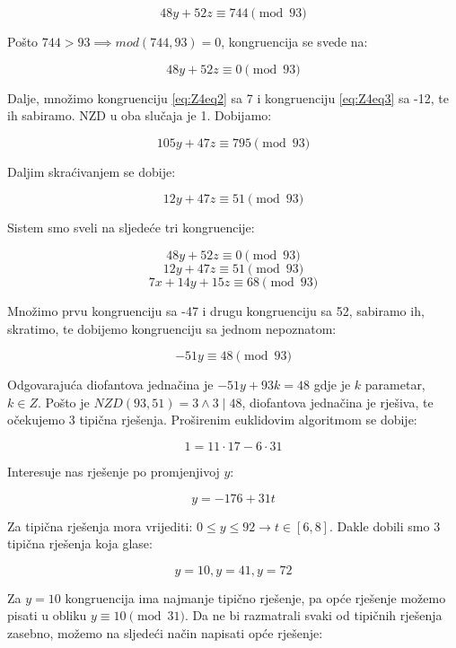 \documentclass[12pt]{article}
\begin{document}
$$48y + 52z \equiv 744 \pmod{93}$$\vspace{1mm}

Pošto $744 > 93 \implies mod(744, 93) = 0$, kongruencija se svede na:

$$48y + 52z \equiv 0 \pmod{93}$$ \vspace{1mm}

Dalje, množimo kongruenciju \ref{eq:Z4eq2} sa 7 i kongruenciju \ref{eq:Z4eq3} sa -12, te ih sabiramo. NZD u oba slučaja je 1. Dobijamo:

$$105y + 47z \equiv 795 \pmod{93}$$\vspace{1mm}

Daljim skraćivanjem se dobije:

$$12y + 47z \equiv 51 \pmod{93}$$\vspace{1mm}

Sistem smo sveli na sljedeće tri kongruencije:

$$48y + 52z \equiv 0 \pmod{93}$$
$$12y + 47z \equiv 51 \pmod{93}$$
$$7x + 14y + 15z \equiv 68 \pmod{93}$$\vspace{1mm}

Množimo prvu kongruenciju sa -47 i drugu kongruenciju sa 52, sabiramo ih, skratimo, te dobijemo kongruenciju sa jednom nepoznatom:

$$-51y \equiv 48 \pmod{93}$$\vspace{1mm}

Odgovarajuća diofantova jednačina je $-51y + 93k = 48$ gdje je $k$ parametar, $k \in Z$. Pošto je $NZD(93, 51) = 3 \land 3 \mid 48$, diofantova jednačina je rješiva, te očekujemo 3 tipična rješenja. Proširenim euklidovim algoritmom se dobije:

$$1 = 11 \cdot 17 - 6 \cdot 31$$\vspace{1mm}

Interesuje nas rješenje po promjenjivoj $y$:

$$y = -176 + 31t$$\vspace{1mm}

Za tipična rješenja mora vrijediti: $0 \leq y \leq 92 \to t \in [6, 8]$. Dakle dobili smo 3 tipična rješenja koja glase:

$$y = 10, y = 41, y = 72$$\vspace{1mm}

Za $y = 10$ kongruencija ima najmanje tipično rješenje, pa opće rješenje možemo pisati u obliku $y \equiv 10 \pmod{31}$. Da ne bi razmatrali svaki od tipičnih rješenja zasebno, možemo na sljedeći način napisati opće rješenje:
\end{document}
